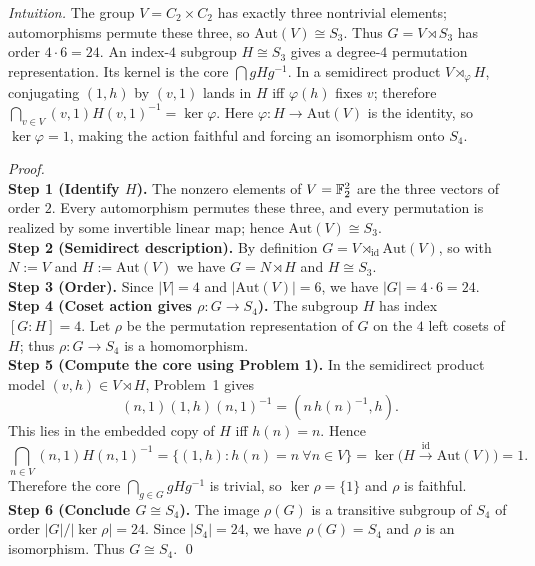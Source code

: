 \documentclass[12pt]{article}
\theoremstyle{definition}
\newcommand{\Aut}{\mathrm{Aut}}
\begin{document}
\dotfill

\emph{Intuition.}
The group $V=C_2\times C_2$ has exactly three nontrivial elements; automorphisms permute these three, so $\Aut(V)\cong S_3$. Thus $G=V\rtimes S_3$ has order $4\cdot6=24$. An index-$4$ subgroup $H\cong S_3$ gives a degree-$4$ permutation representation. Its kernel is the core $\bigcap gHg^{-1}$. In a semidirect product $V\rtimes_\varphi H$, conjugating $(1,h)$ by $(v,1)$ lands in $H$ iff $\varphi(h)$ fixes $v$; therefore $\bigcap_{v\in V}(v,1)H(v,1)^{-1}=\ker\varphi$. Here $\varphi:H\to\Aut(V)$ is the identity, so $\ker\varphi=1$, making the action faithful and forcing an isomorphism onto $S_4$.\\

\dotfill

\emph{Proof.}\\
\textbf{Step 1 (Identify $H$).} The nonzero elements of $V=\Bbb F_2^2$ are the three vectors of order $2$. Every automorphism permutes these three, and every permutation is realized by some invertible linear map; hence $\Aut(V)\cong S_3$.\\
\textbf{Step 2 (Semidirect description).} By definition $G=V\rtimes_{\mathrm{id}} \Aut(V)$, so with $N:=V$ and $H:=\Aut(V)$ we have $G=N\rtimes H$ and $H\cong S_3$.\\
\textbf{Step 3 (Order).} Since $|V|=4$ and $|\Aut(V)|=6$, we have $|G|=4\cdot6=24$.\\
\textbf{Step 4 (Coset action gives $\rho:G\to S_4$).} The subgroup $H$ has index $[G\!:\!H]=4$. Let $\rho$ be the permutation representation of $G$ on the $4$ left cosets of $H$; thus $\rho:G\to S_4$ is a homomorphism.\\
\textbf{Step 5 (Compute the core using Problem 1).} In the semidirect product model $(v,h)\in V\rtimes H$, Problem~1 gives
\[
(n,1)(1,h)(n,1)^{-1}=(n\,h(n)^{-1},h).
\]
This lies in the embedded copy of $H$ iff $h(n)=n$. Hence
\[
\bigcap_{n\in V}(n,1)H(n,1)^{-1}=\{(1,h):h(n)=n\ \forall n\in V\}=\ker\big(H\xrightarrow{\;\mathrm{id}\;} \Aut(V)\big)=1.
\]
Therefore the core $\bigcap_{g\in G} gHg^{-1}$ is trivial, so $\ker\rho=\{1\}$ and $\rho$ is faithful.\\
\textbf{Step 6 (Conclude $G\cong S_4$).} The image $\rho(G)$ is a transitive subgroup of $S_4$ of order $|G|/|\ker\rho|=24$. Since $|S_4|=24$, we have $\rho(G)=S_4$ and $\rho$ is an isomorphism. Thus $G\cong S_4$. \qed

\newpage
\end{document}
